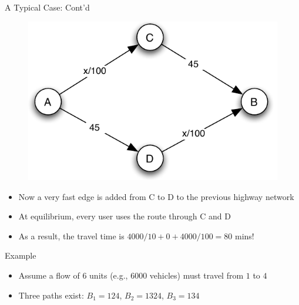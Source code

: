 \documentclass[10pt]{beamer}
\begin{document}
\begin{frame}{A Typical Case: Cont'd}
  \begin{figure}
    \includegraphics[scale=.8,page=2]{fig/note02/braess.pdf}
  \end{figure}
  \onslide<+->
  \begin{itemize}[<+->]
    \item Now a very fast edge is added from C to D to the previous highway network
    \item At equilibrium, every user uses the route through C and D 
    \item As a result, the travel time is $4000 / 10 + 0 + 4000 / 100 = 80$ mins!
  \end{itemize}
\end{frame}

\begin{frame}{\cite{braess05} Example}
  \begin{center}
  \end{center}
  \onslide<+->
  \begin{itemize}[<+->]
    \item Assume a flow of 6 units (e.g., 6000 vehicles) must travel from $1$ to $4$
    \item Three paths exist: $B_1 = 124$, $B_2 = 1324$, $B_3 = 134$
  \end{itemize}
\end{frame}
\end{document}
